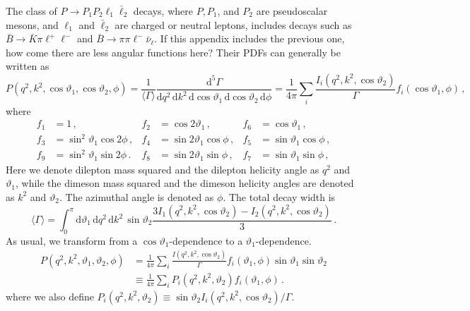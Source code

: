 \documentclass[aps,prd,reprint,nofootinbib,preprintnumbers]{revtex4}
\newcommand{\dd}{\text{d}}
\renewcommand{\theta}{\vartheta}
\newcommand{\fred}[1]{{\color{brown!85!black}#1}}
\begin{document}
The class of $P\to P_1 P_2 \ell_1\bar\ell_2$ decays, where $P,P_1$, and $P_2$ are pseudoscalar mesons,
and $\ell_1$ and $\bar\ell_2$ are charged or neutral leptons, includes decays
such as $\bar{B}\to\bar{K}\pi\ell^+\ell^-$ and $\bar{B}\to \pi\pi\ell^-\bar\nu_\ell$. \fred{If this appendix includes the previous one, how come there are less angular functions here?}
Their PDFs can generally be written as \cite{Lee:1992ih}
\begin{equation}
    P(q^2, k^2, \cos\theta_1, \cos \theta_2, \phi) = \frac{1}{\langle \Gamma\rangle}\frac{\dd^5 \Gamma}{\dd q^2\,\dd k^2\, \dd\cos\theta_1\,\dd\cos\theta_2\,\dd\phi} = \frac{1}{4\pi} \sum_i \frac{I_i(q^2, k^2, \cos\theta_2)}{\Gamma} f_i(\cos\theta_1,\phi)\,,
\end{equation}
where
\begin{equation}
\begin{aligned}
    f_1 & = 1\,,              &
    f_2 & = \cos 2\theta_1\,, &
    f_6 & = \cos  \theta_1\,, \\
    f_3 & = \sin^2\theta_1 \cos 2\phi\,,&
    f_4 & = \sin 2\theta_1 \cos  \phi\,,&
    f_5 & = \sin  \theta_1 \cos  \phi\,,\\
    f_9 & = \sin^2\theta_1 \sin 2\phi\,.&
    f_8 & = \sin 2\theta_1 \sin  \phi\,,&
    f_7 & = \sin  \theta_1 \sin  \phi\,,
\end{aligned}
\end{equation}
Here we denote dilepton mass squared and the dilepton helicity angle as $q^2$ and $\theta_1$, while
the dimeson mass squared and the dimeson helicity angles are denoted as $k^2$ and $\theta_2$. The
azimuthal angle is denoted as $\phi$. The total decay width is
\begin{equation}
    \langle \Gamma\rangle = \int_0^\pi \dd\theta_1\,\dd q^2\,\dd k^2\,\sin\theta_2 \frac{3I_1(q^2, k^2, \cos\theta_2) - I_2(q^2, k^2, \cos\theta_2)}{3}\,.
\end{equation}
As usual, we transform from a $\cos\theta_1$-dependence to a $\theta_1$-dependence.
\begin{equation}
\begin{aligned}
    P(q^2, k^2, \theta_1, \theta_2, \phi)
    & = \frac{1}{4\pi} \sum_i \frac{I(q^2, k^2, \cos\theta_2)}{\Gamma} f_i(\theta_1, \phi) \sin\theta_1 \sin\theta_2\\
    & \equiv \frac{1}{4\pi} \sum_i P_i(q^2, k^2, \theta_2) f_i(\theta_1, \phi)\,.
\end{aligned}
\end{equation}
where we also define $P_i(q^2, k^2, \theta_2) \equiv \sin\theta_2 I_i(q^2, k^2, \cos\theta_2) / \Gamma$.\\
\end{document}
